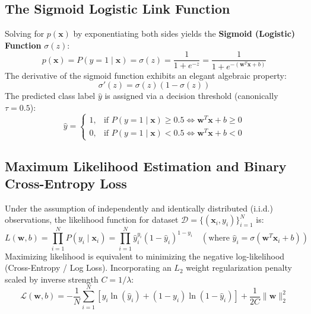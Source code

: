 \documentclass[12pt]{article}
\begin{document}
\subsection{The Sigmoid Logistic Link Function}
Solving for $p(\mathbf{x})$ by exponentiating both sides yields the \textbf{Sigmoid (Logistic) Function} $\sigma(z)$:
\begin{equation}
    p(\mathbf{x}) = P(y = 1 \mid \mathbf{x}) = \sigma(z) = \frac{1}{1 + e^{-z}} = \frac{1}{1 + e^{-(\mathbf{w}^T \mathbf{x} + b)}}
\end{equation}
The derivative of the sigmoid function exhibits an elegant algebraic property:
\begin{equation}
    \sigma'(z) = \sigma(z)(1 - \sigma(z))
\end{equation}
The predicted class label $\hat{y}$ is assigned via a decision threshold (canonically $\tau = 0.5$):
\begin{equation}
    \hat{y} = \begin{cases} 1, & \text{if } P(y=1 \mid \mathbf{x}) \ge 0.5 \iff \mathbf{w}^T \mathbf{x} + b \ge 0 \\ 0, & \text{if } P(y=1 \mid \mathbf{x}) < 0.5 \iff \mathbf{w}^T \mathbf{x} + b < 0 \end{cases}
\end{equation}

\subsection{Maximum Likelihood Estimation and Binary Cross-Entropy Loss}
Under the assumption of independently and identically distributed (i.i.d.) observations, the likelihood function for dataset $\mathcal{D} = \{(\mathbf{x}_i, y_i)\}_{i=1}^N$ is:
\begin{equation}
    L(\mathbf{w}, b) = \prod_{i=1}^{N} P(y_i \mid \mathbf{x}_i) = \prod_{i=1}^{N} \hat{y}_i^{y_i} (1 - \hat{y}_i)^{1 - y_i} \quad (\text{where } \hat{y}_i = \sigma(\mathbf{w}^T \mathbf{x}_i + b))
\end{equation}
Maximizing likelihood is equivalent to minimizing the negative log-likelihood (Cross-Entropy / Log Loss). Incorporating an $L_2$ weight regularization penalty scaled by inverse strength $C = 1 / \lambda$:
\begin{equation}
    \mathcal{L}(\mathbf{w}, b) = -\frac{1}{N} \sum_{i=1}^{N} \left[ y_i \ln(\hat{y}_i) + (1 - y_i)\ln(1 - \hat{y}_i) \right] + \frac{1}{2C} \|\mathbf{w}\|_2^2
\end{equation}
\end{document}
